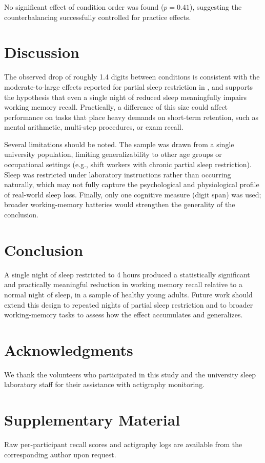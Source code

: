 \documentclass[11pt, a4paper]{article}
\begin{document}
No significant effect of condition order was found ($p = 0.41$),
suggesting the counterbalancing successfully controlled for practice
effects.

\section{Discussion}
\label{sec:discussion}

The observed drop of roughly 1.4 digits between conditions is consistent
with the moderate-to-large effects reported for partial sleep restriction
in \citet{lowe2017}, and supports the hypothesis that even a single night
of reduced sleep meaningfully impairs working memory recall. Practically,
a difference of this size could affect performance on tasks that place
heavy demands on short-term retention, such as mental arithmetic,
multi-step procedures, or exam recall.

Several limitations should be noted. The sample was drawn from a single
university population, limiting generalizability to other age groups or
occupational settings (e.g., shift workers with chronic partial sleep
restriction). Sleep was restricted under laboratory instructions rather
than occurring naturally, which may not fully capture the psychological
and physiological profile of real-world sleep loss. Finally, only one
cognitive measure (digit span) was used; broader working-memory batteries
would strengthen the generality of the conclusion.

\section{Conclusion}
\label{sec:conclusion}

A single night of sleep restricted to 4 hours produced a statistically
significant and practically meaningful reduction in working memory recall
relative to a normal night of sleep, in a sample of healthy young adults.
Future work should extend this design to repeated nights of partial sleep
restriction and to broader working-memory tasks to assess how the effect
accumulates and generalizes.

\section*{Acknowledgments}
We thank the volunteers who participated in this study and the university
sleep laboratory staff for their assistance with actigraphy monitoring.




\appendix
\section{Supplementary Material}
\label{sec:appendix}

Raw per-participant recall scores and actigraphy logs are available from
the corresponding author upon request.
\end{document}
